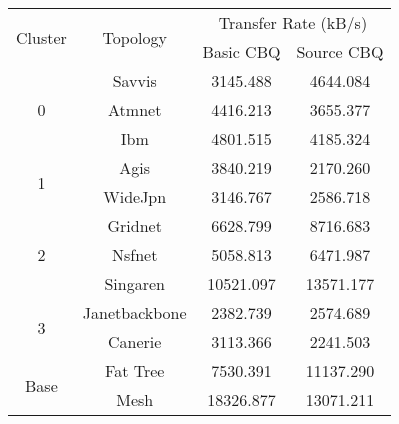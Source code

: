 \begin{tabular}{cccc}
\toprule
\multirow{2}{*}{Cluster} & \multirow{2}{*}{Topology} & \multicolumn{2}{c}{Transfer Rate (kB/s)} \\
& & Basic CBQ & Source CBQ \\
\midrule
\multirow{3}{*}{0} & Savvis & \num{3145.488} & \num{4644.084} \\
& Atmnet & \num{4416.213} & \num{3655.377} \\
& Ibm & \num{4801.515} & \num{4185.324} \\ \hline
\multirow{2}{*}{1} & Agis & \num{3840.219} & \num{2170.260} \\
& WideJpn & \num{3146.767} & \num{2586.718} \\ \hline
\multirow{3}{*}{2} & Gridnet & \num{6628.799} & \num{8716.683} \\
& Nsfnet & \num{5058.813} & \num{6471.987} \\
& Singaren & \num{10521.097} & \num{13571.177} \\ \hline
\multirow{2}{*}{3} & Janetbackbone & \num{2382.739} & \num{2574.689} \\
& Canerie & \num{3113.366} & \num{2241.503} \\ \hline
\multirow{2}{*}{Base} & Fat Tree & \num{7530.391} & \num{11137.290}\\
& Mesh & \num{18326.877} & \num{13071.211} \\ 

\bottomrule
\end{tabular}

